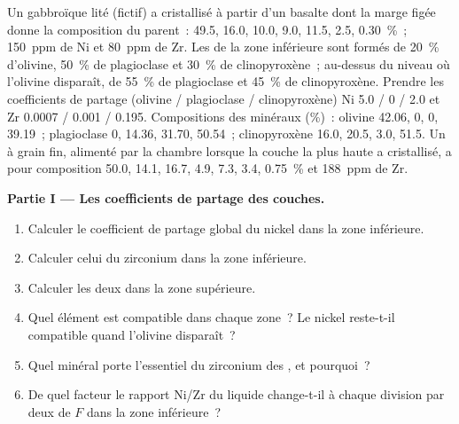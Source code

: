 \begin{problem}
\label{pb:b2:magmatic-differentiation:1}
Un  gabbroïque lité (fictif) a cristallisé à partir d'un basalte dont la marge figée
donne la composition du parent~:  49.5,  16.0,  10.0,
 9.0,  11.5,  2.5,  \qty{0.30}{\percent}~;
\qty{150}{ppm} de Ni et \qty{80}{ppm} de Zr. Les  de la zone inférieure sont formés de
\qty{20}{\percent} d'olivine, \qty{50}{\percent} de plagioclase et \qty{30}{\percent}
de clinopyroxène~; au-dessus du niveau où l'olivine disparaît, de \qty{55}{\percent}
de plagioclase et \qty{45}{\percent} de clinopyroxène. Prendre les coefficients de partage
(olivine / plagioclase / clinopyroxène) Ni 5.0 / 0 / 2.0 et Zr 0.0007 / 0.001 /
0.195. Compositions des minéraux (\unit{\percent})~: olivine  42.06,  0,
 0,  39.19~; plagioclase 0, 14.36, 31.70, 50.54~; clinopyroxène
16.0, 20.5, 3.0, 51.5. Un 
à grain fin, alimenté par la chambre lorsque la couche la plus haute a cristallisé, a pour composition
 50.0,  14.1,  16.7,  4.9,  7.3,
 3.4,  \qty{0.75}{\percent} et \qty{188}{ppm} de Zr.

\noindent\textbf{Partie I --- Les coefficients de partage des couches.}
\begin{enumerate}
\item Calculer le coefficient de partage global du nickel dans la zone inférieure.
\item Calculer celui du zirconium dans la zone inférieure.
\item Calculer les deux dans la zone supérieure.
\item Quel élément est compatible dans chaque zone~? Le nickel reste-t-il compatible
quand l'olivine disparaît~?
\item Quel minéral porte l'essentiel du zirconium des , et pourquoi~?
\item De quel facteur le rapport Ni/Zr du liquide change-t-il à chaque division par deux de $F$
dans la zone inférieure~?
\end{enumerate}


\end{problem}
